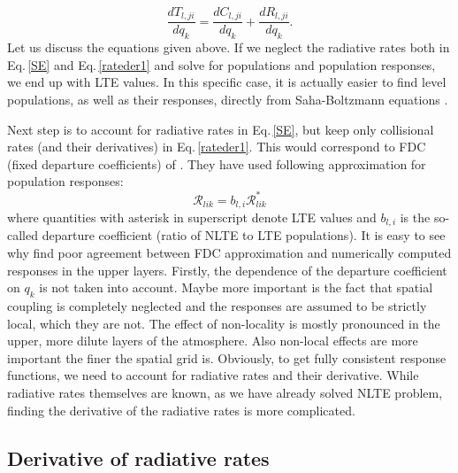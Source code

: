 \documentclass[referee]{aa}
\begin{document}
\begin{equation}
\frac{d T_{l,ji}}{d q_k} = \frac{d C_{l,ji}}{d q_k} + \frac{d R_{l,ji}}{d q_k}.
\label{rateder2}
\end{equation}
Let us discuss the equations given above. If we neglect the radiative rates both in Eq.\,\ref{SE} and Eq.\,\ref{rateder1} and solve for populations and population responses, we end up with LTE values. In this specific case, it is actually easier to find level populations, as well as their responses, directly from Saha-Boltzmann equations \citep[see, e.g.][]{SIR}. 

Next step is to account for radiative rates in Eq.\,\ref{SE}, but keep only collisional rates (and their derivatives) in Eq.\,\ref{rateder1}. This would correspond to FDC (fixed departure coefficients) of \citet{HectorI}. They have used following approximation for population responses:
\begin{equation}
{\mathcal R}_{lik} = b_{l,i}  {\mathcal R}^*_{lik}
\end{equation}
where quantities with asterisk in superscript denote LTE values and $b_{l,i}$ is the so-called departure coefficient (ratio of NLTE to LTE populations). It is easy to see why \citet{HectorI} find poor agreement between FDC approximation and numerically computed responses in the upper layers. Firstly, the dependence of the departure coefficient on $q_k$ is not taken into account. Maybe more important is the fact that spatial coupling is completely neglected and the responses are assumed to be strictly local, which they are not. The effect of non-locality is mostly pronounced in the upper, more dilute layers of the atmosphere. Also non-local effects are more important the finer the spatial grid is. Obviously, to get fully consistent response functions, we need to account for radiative rates and their derivative. While radiative rates themselves are known, as we have already solved NLTE problem, finding the derivative of the radiative rates is more complicated.

\subsection{Derivative of radiative rates}
\end{document}
